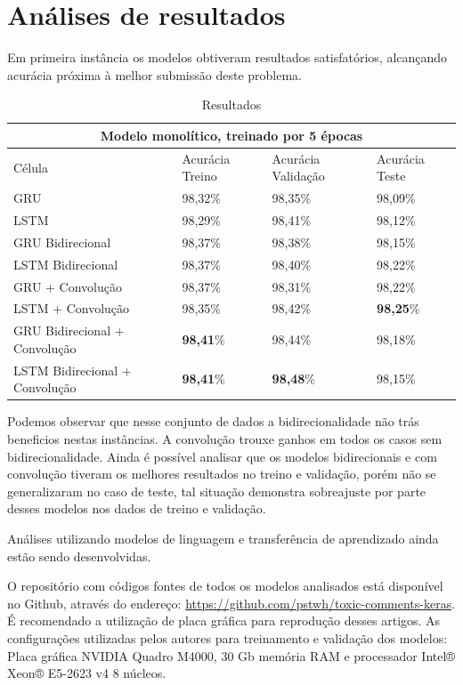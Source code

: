 \documentclass[12pt]{article}
\begin{document}
\section{Análises de resultados}

Em primeira instância os modelos obtiveram resultados satisfatórios, alcançando acurácia próxima à melhor submissão deste problema.

\begin{table}[!htb]
  \small
  \centering
  \renewcommand{\arraystretch}{1.15}
  \begin{tabular}{llll}
      \hline
      \multicolumn{4}{c}{Modelo monolítico, treinado por 5 épocas} \\
      \hline
    \hline
     Célula & Acurácia Treino & Acurácia Validação & Acurácia Teste \\
    GRU & 98,32\% & 98,35\% & 98,09\% \\
    LSTM & 98,29\% & 98,41\% & 98,12\% \\
    GRU Bidirecional & 98,37\% & 98,38\% & 98,15\% \\
    LSTM Bidirecional & 98,37\% & 98,40\% & 98,22\% \\
    GRU + Convolução & 98,37\% & 98,31\% & 98,22\% \\
    LSTM + Convolução & 98,35\% & 98,42\% & \textbf{98,25}\% \\
    GRU Bidirecional + Convolução & \textbf{98,41}\% & 98,44\% & 98,18\% \\
    LSTM Bidirecional + Convolução & \textbf{98,41}\% & \textbf{98,48}\% & 98,15\% \\
    \hline
  \end{tabular}
  \caption{Resultados}
  \label{tab:ptb}
\end{table}


Podemos observar que nesse conjunto de dados a bidirecionalidade não trás beneficios nestas instâncias. A convolução trouxe ganhos em todos os casos sem bidirecionalidade. Ainda é possível analisar que os modelos bidirecionais e com convolução tiveram os melhores resultados no treino e validação, porém não se generalizaram no caso de teste, tal situação demonstra sobreajuste por parte desses modelos nos dados de treino e validação.

Análises utilizando modelos de linguagem e transferência de aprendizado ainda estão sendo desenvolvidas.

O repositório com códigos fontes de todos os modelos analisados está disponível no Github, através do endereço: \url{https://github.com/pstwh/toxic-comments-keras}. É recomendado a utilização de placa gráfica para reprodução desses artigos. As configurações utilizadas pelos autores para treinamento e validação dos modelos: Placa gráfica NVIDIA Quadro M4000, 30 Gb memória RAM e processador Intel® Xeon® E5-2623 v4 8 núcleos.
\end{document}
